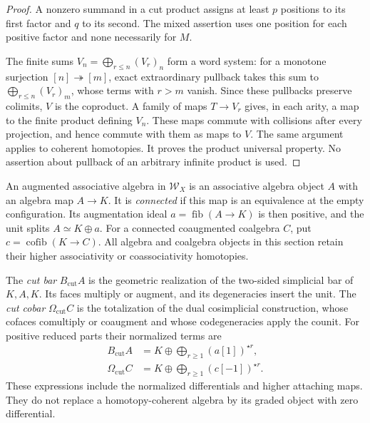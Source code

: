 \begin{proof}
A nonzero summand in a cut product assigns at least \(p\) positions
to its first factor and \(q\) to its second. The mixed assertion
uses one position for each positive factor and none necessarily
for \(M\).

The finite sums \(V_n=\bigoplus_{r\leq n}(V_r)_n\) form a word
system: for a monotone surjection \([n]\twoheadrightarrow[m]\),
exact extraordinary pullback takes this sum to
\(\bigoplus_{r\leq n}(V_r)_m\), whose terms with \(r>m\) vanish.
Since these pullbacks preserve colimits, \(V\) is the coproduct.
A family of maps \(T\to V_r\) gives, in each arity, a map to the
finite product defining \(V_n\). These maps commute with collisions
after every projection, and hence commute with them as maps to
\(V\). The same argument applies to coherent homotopies. It proves
the product universal property. No assertion about pullback of an
arbitrary infinite product is used.
\end{proof}

An augmented associative algebra in \(\mathcal W_X\) is an
associative algebra object \(A\) with an algebra map \(A\to K\).
It is \emph{connected} if this map is an equivalence at the empty
configuration. Its augmentation ideal
\(a=\operatorname{fib}(A\to K)\) is then positive, and the unit
splits \(A\simeq K\oplus a\). For a connected coaugmented coalgebra
\(C\), put \(c=\operatorname{cofib}(K\to C)\).
All algebra and coalgebra objects in this section retain their
higher associativity or coassociativity homotopies.

The \emph{cut bar} \(B_{\mathrm{cut}}A\) is the geometric
realization of the two-sided simplicial bar of \(K,A,K\).
Its faces multiply or augment, and its degeneracies insert the
unit. The \emph{cut cobar} \(\Omega_{\mathrm{cut}}C\) is the
totalization of the dual cosimplicial construction, whose cofaces
comultiply or coaugment and whose codegeneracies apply the counit.
For positive reduced parts their normalized terms are
\begin{equation}\label{v4-eq:bar-cut-normalized}
 \begin{split}
 B_{\mathrm{cut}}A&=K\oplus\bigoplus_{r\geq1}(a[1])^{\star r},\\
 \Omega_{\mathrm{cut}}C&=K\oplus\bigoplus_{r\geq1}(c[-1])^{\star r}.
 \end{split}
\end{equation}
These expressions include the normalized differentials and higher
attaching maps. They do not replace a homotopy-coherent algebra by
its graded object with zero differential.

